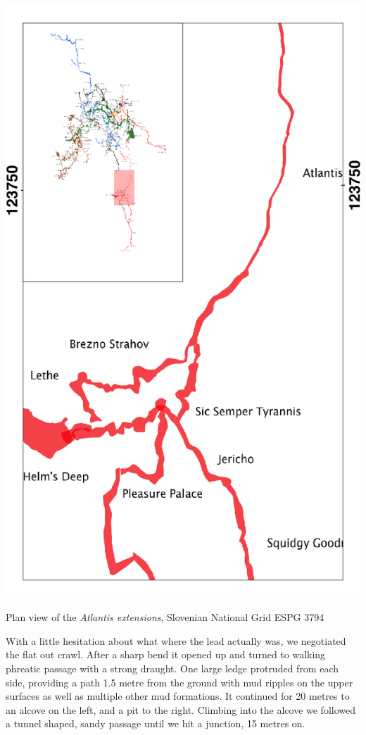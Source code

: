 \begin{marginfigure}
\checkoddpage \ifoddpage \forcerectofloat \else \forceversofloat \fi
\centering
 \includegraphics[width=\linewidth]{images/2014/tanguy-2014/atlantis_inset}
 \caption{Plan view of the \emph{Atlantis extensions}, Slovenian National Grid ESPG 3794}
 \label{Atlantis inset}
\end{marginfigure}

With a little hesitation about what where the lead actually was, we negotiated the flat out crawl. After a sharp bend it opened up and turned to walking phreatic passage with a strong draught. One large ledge protruded from each side, providing a path 1.5 metre from the ground with mud ripples on the upper surfaces as well as multiple other mud formations. It continued for 20 metres to an alcove on the left, and a pit to the right. Climbing into the alcove we followed a tunnel shaped, sandy passage until we hit a junction, 15 metres on. 


